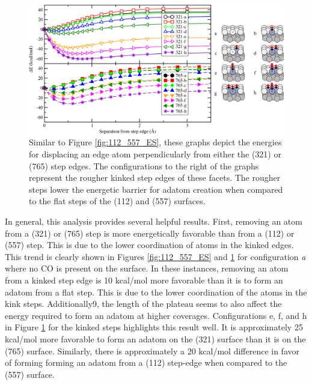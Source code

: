 \begin{landscape}
\begin{figure}[p!]
  \centering
  \includegraphics[width=0.9\linewidth]{../figures/chap4/321_765_EnergySeparation_CO.pdf}
  \caption{Similar to Figure \ref{fig:112_557_ES}, these graphs depict the
energies for displacing an edge atom perpendicularly from either the (321) or
(765) step edges. The configurations to the right of the graphs represent the
rougher kinked step edges of these facets. The rougher steps lower the 
energetic barrier for adatom creation when compared to the flat steps of the
(112) and (557) surfaces.}
\label{fig:321_765_ES}
\end{figure}
\end{landscape}

In general, this analysis provides several helpful results. First, removing an
atom from a (321) or (765) step is more energetically favorable than from a
(112) or (557) step. This is due to the lower coordination of atoms in
the kinked edges. This trend is clearly shown in Figures \ref{fig:112_557_ES}
and \ref{fig:321_765_ES} for configuration {\em a} where no CO is present on the
surface. In these instances, removing an atom from a kinked step edge is 10
kcal/mol more favorable than it is to form an adatom from a flat step. This is
due to the lower coordination of the atoms in the kink steps.
Additionally9, the length of the plateau seems to also affect the energy required to form
an adatom at higher coverages.  Configurations e, f, and h in Figure
\ref{fig:321_765_ES} for the kinked steps highlights this result well. It is
approximately 25 kcal/mol more favorable to form an adatom on the (321) surface
than it is on the (765) surface. Similarly, there is approximately a 20
kcal/mol difference in favor of forming  forming an adatom from a (112) step-edge when
compared to the (557) surface.

